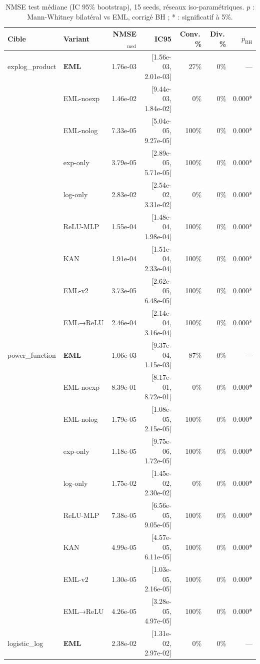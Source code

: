 \begin{table}[t]
\centering
\caption{NMSE test médiane (IC 95\% bootstrap), 15 seeds, réseaux iso-paramétriques. $p$ : Mann-Whitney bilatéral vs EML, corrigé BH ; * : significatif à 5\%.}
\label{tab:eml_ablation}
\small
\begin{tabular}{llrrrrr}
\toprule
Cible & Variant & NMSE$_{\mathrm{med}}$ & IC95 & Conv.\,\% & Div.\,\% & $p_{\mathrm{BH}}$ \\
\midrule
explog\_product & \textbf{EML} & 1.76e-03 & [1.56e-03, 2.01e-03] & 27\% & 0\% & — \\
 & EML-noexp & 1.46e-02 & [9.44e-03, 1.84e-02] & 0\% & 0\% & 0.000* \\
 & EML-nolog & 7.33e-05 & [5.04e-05, 9.27e-05] & 100\% & 0\% & 0.000* \\
 & exp-only & 3.79e-05 & [2.89e-05, 5.71e-05] & 100\% & 0\% & 0.000* \\
 & log-only & 2.83e-02 & [2.54e-02, 3.31e-02] & 0\% & 0\% & 0.000* \\
 & ReLU-MLP & 1.55e-04 & [1.48e-04, 1.98e-04] & 100\% & 0\% & 0.000* \\
 & KAN & 1.91e-04 & [1.51e-04, 2.33e-04] & 100\% & 0\% & 0.000* \\
 & EML-v2 & 3.73e-05 & [2.62e-05, 6.48e-05] & 100\% & 0\% & 0.000* \\
 & EML→ReLU & 2.46e-04 & [2.14e-04, 3.16e-04] & 100\% & 0\% & 0.000* \\
\midrule
power\_function & \textbf{EML} & 1.06e-03 & [9.37e-04, 1.15e-03] & 87\% & 0\% & — \\
 & EML-noexp & 8.39e-01 & [8.17e-01, 8.72e-01] & 0\% & 0\% & 0.000* \\
 & EML-nolog & 1.79e-05 & [1.08e-05, 2.15e-05] & 100\% & 0\% & 0.000* \\
 & exp-only & 1.18e-05 & [9.75e-06, 1.72e-05] & 100\% & 0\% & 0.000* \\
 & log-only & 1.75e-02 & [1.45e-02, 2.30e-02] & 0\% & 0\% & 0.000* \\
 & ReLU-MLP & 7.38e-05 & [6.56e-05, 9.05e-05] & 100\% & 0\% & 0.000* \\
 & KAN & 4.99e-05 & [4.57e-05, 6.11e-05] & 100\% & 0\% & 0.000* \\
 & EML-v2 & 1.30e-05 & [1.03e-05, 2.16e-05] & 100\% & 0\% & 0.000* \\
 & EML→ReLU & 4.26e-05 & [3.28e-05, 4.97e-05] & 100\% & 0\% & 0.000* \\
\midrule
logistic\_log & \textbf{EML} & 2.38e-02 & [1.31e-02, 2.97e-02] & 0\% & 0\% & — \\

\end{tabular}
\end{table}
